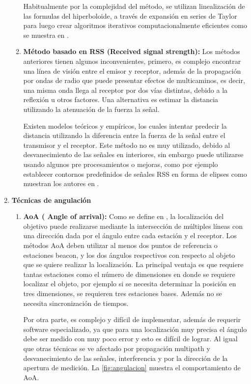 \begin{enumerate}
\begin{enumerate}
Habitualmente por la complejidad del método, se utilizan linealización de las formulas del hiperboloide, a través de expansión en series de Taylor para luego crear algoritmos iterativos computacionalmente eficientes como se muestra en \citep{4103919}.

\item \textbf{Método basado en RSS (Received signal strength):}  Los métodos anteriores tienen algunos inconvenientes, primero, es complejo encontrar una línea de visión entre el emisor y receptor, además de la propagación por ondas de radio que puede presentar efectos de multicaminos, es decir, una misma onda llega al receptor por dos vías distintas, debido a la reflexión u otros factores. Una alternativa es estimar la distancia utilizando la atenuación de la fuerza la señal.

Existen modelos teóricos y empíricos, los cuales intentar predecir la distancia utilizando la diferencia entre la fuerza de la señal entre el transmisor y el receptor. Este método no es muy utilizado, debido al desvanecimiento de las señales en interiores, sin embargo puede utilizarse usando algunos pre procesamientos o mejoras, como por ejemplo establecer contornos predefinidos de señales RSS en forma de elipses  como muestran los autores en \citep{1423549}.

\end{enumerate}

\item \textbf{Técnicas de angulación }
\begin{enumerate}
\item \textbf{AoA ( Angle of arrival):} Como se define en \citep{665} , la localización del objetivo puede realizarse mediante la intersección de múltiples líneas con una dirección dada por el ángulo entre cada estación y el receptor. Los métodos AoA deben utilizar al menos dos puntos de referencia o estaciones beacon,  y los dos ángulos respectivos con respecto al objeto que se quiere realizar la localización. La principal ventaja es que requiere tantas estaciones como el número de dimensiones en donde se requiere localizar el objeto, por ejemplo si se necesita determinar la posición en tres dimensiones, se requieren tres estaciones bases. Además no se necesita sincronización de tiempos.

Por otra parte, es complejo y difícil de implementar, además de requerir software especializado, ya que para una localización muy precisa el ángulo debe ser medido con muy poco error y esto es difícil de lograr. Al igual que otras técnicas se ve afectado por propagación multipath y desvanecimiento de las señales, interferencia y por la dirección de la apertura de medición. La \autoref{fig:angulacion} muestra el comportamiento de AoA.


\end{enumerate}
\end{enumerate}
